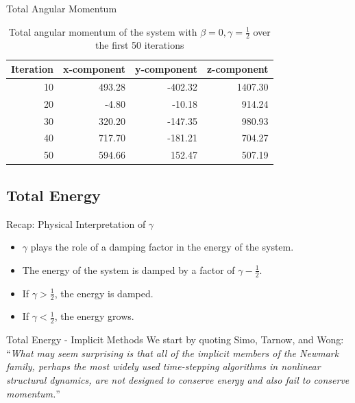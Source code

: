 \documentclass{beamer}
\begin{document}
\begin{frame}{Total Angular Momentum}
\begin{table}
	\centering
	\begin{tabular}{ |r|r|r|r| }
		\hline
		Iteration & x-component & y-component & z-component\\
		\hline
		10 & 493.28 & -402.32 & 1407.30 \\
		20 & -4.80 & -10.18 & 914.24 \\
		30 & 320.20 & -147.35 & 980.93 \\
		40 & 717.70 & -181.21 & 704.27 \\
		50 & 594.66 & 152.47 & 507.19 \\
		\hline
	\end{tabular}
	\caption{Total angular momentum of the system with $\beta = 0, \gamma = \frac{1}{2}$ over the first 50 iterations}
	\label{tbl:total_angular_momentum_50_iterations}
\end{table}
\end{frame}

\subsection{Total Energy}
\begin{frame}{Recap: Physical Interpretation of $\gamma$}
\begin{itemize}
	\item
	$\gamma$ plays the role of a damping factor in the energy of the system.
	\item
	The energy of the system is damped by a factor of $\gamma - \frac{1}{2}$.
	\item
	If $\gamma > \frac{1}{2}$, the energy is damped.
	\item
	If $\gamma < \frac{1}{2}$, the energy grows.
\end{itemize}
\end{frame}

\begin{frame}{Total Energy - Implicit Methods}
We start by quoting Simo, Tarnow, and Wong: \\
``\textit{What may seem surprising is that all of the implicit members of the Newmark family, perhaps the most widely used time-stepping algorithms in nonlinear structural dynamics, are not designed to conserve energy and also fail to conserve momentum.}''
\end{frame}
\end{document}
